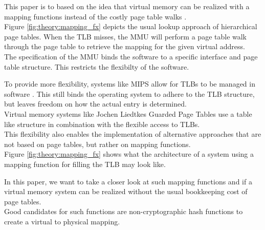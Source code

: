 This paper is to based on the idea that virtual memory can be realized with a
mapping functions instead of the costly page table walks \cite{van2002memory}.\\


Figure \ref{fig:theory:mapping_fx} depicts the usual lookup approach of hierarchical page tables.
When the TLB misses, the MMU will perform a page table walk through the page table to retrieve the mapping
for the given virtual address.\\
The specification of the MMU binds the software to a specific interface and page table structure. This restricts
the flexibilty of the software.

To provide more flexibility, systems like MIPS allow for TLBs to be managed in software \cite{heiserAnatomyHighPerformanceMicrokernel}.
This still binds the operating system to adhere to the TLB structure, but leaves freedom on how the actual
entry is determined.\\
Virtual memory systems like Jochen Liedtkes Guarded Page Tables \cite{liedtkeGPT} use a table like structure
in combination with the flexible access to TLBs.\\
This flexibility also enables the implementation of alternative approaches that are not based on page tables,
but rather on mapping functions.\\
Figure \ref{fig:theory:mapping_fx} shows what the architecture of a system using a mapping function for
filling the TLB may look like.

In this paper, we want to take a closer look at such mapping functions and if a virtual memory system
can be realized without the usual bookkeeping cost of page tables.\\
Good candidates for such functions are non-cryptographic hash functions
to create a virtual to physical mapping.




